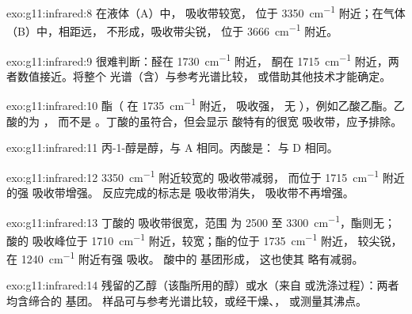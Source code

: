 \begin{solution}{exo:g11:infrared:8}
在液体（A）中， 吸收带较宽，
位于 \qty{3350}{cm^{-1}} 附近；在气体（B）中，相距远，
不形成，吸收带尖锐，
位于 \qty{3666}{cm^{-1}} 附近。
\end{solution}

\begin{solution}{exo:g11:infrared:9}
很难判断：醛在 \qty{1730}{cm^{-1}} 附近，
酮在 \qty{1715}{cm^{-1}} 附近，两者数值接近。将整个
光谱（含）与参考光谱比较，
或借助其他技术才能确定。
\end{solution}

\begin{solution}{exo:g11:infrared:10}
酯（ 在 \qty{1735}{cm^{-1}} 附近， 吸收强，
无 ），例如乙酸乙酯。乙酸的为 ，
而不是 。丁酸的虽符合，但会显示
酸特有的很宽  吸收带，应予排除。
\end{solution}

\begin{solution}{exo:g11:infrared:11}
丙-1-醇是醇，与 A 相同。丙酸是：
与 D 相同。
\end{solution}

\begin{solution}{exo:g11:infrared:12}
\qty{3350}{cm^{-1}} 附近较宽的  吸收带减弱，
而位于 \qty{1715}{cm^{-1}} 附近的强  吸收带增强。
反应完成的标志是  吸收带消失，
 吸收带不再增强。
\end{solution}

\begin{solution}{exo:g11:infrared:13}
丁酸的  吸收带很宽，范围
为 2500 至 \qty{3300}{cm^{-1}}，酯则无；
酸的  吸收峰位于 \qty{1710}{cm^{-1}} 附近，较宽；酯的位于 \qty{1735}{cm^{-1}} 附近，
较尖锐，在 \qty{1240}{cm^{-1}} 附近有强  吸收。
酸中的  基团形成，
这也使其  略有减弱。
\end{solution}

\begin{solution}{exo:g11:infrared:14}
残留的乙醇（该酯所用的醇）或水（来自
或洗涤过程）：两者均含缔合的  基团。
样品可与参考光谱比较，或经干燥、，
或测量其沸点。
\end{solution}


